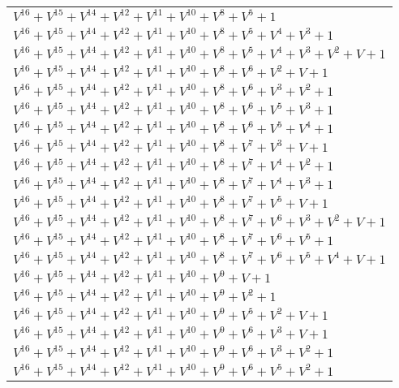\documentclass[12pt]{article}
\begin{document}
\begin{adjustwidth}{-4cm}{}
\begin{center}
\begin{longtable}{|l|}
$V^{16}  +V^{15}  +V^{14}  +V^{12}  +V^{11}  +V^{10}  +V^{8}  +V^{5}  + 1$ \\
$V^{16}  +V^{15}  +V^{14}  +V^{12}  +V^{11}  +V^{10}  +V^{8}  +V^{5}  +V^{4}  +V^{3}  + 1$ \\
$V^{16}  +V^{15}  +V^{14}  +V^{12}  +V^{11}  +V^{10}  +V^{8}  +V^{5}  +V^{4}  +V^{3}  +V^{2}  + V + 1$ \\
$V^{16}  +V^{15}  +V^{14}  +V^{12}  +V^{11}  +V^{10}  +V^{8}  +V^{6}  +V^{2}  + V + 1$ \\
$V^{16}  +V^{15}  +V^{14}  +V^{12}  +V^{11}  +V^{10}  +V^{8}  +V^{6}  +V^{3}  +V^{2}  + 1$ \\
$V^{16}  +V^{15}  +V^{14}  +V^{12}  +V^{11}  +V^{10}  +V^{8}  +V^{6}  +V^{5}  +V^{3}  + 1$ \\
$V^{16}  +V^{15}  +V^{14}  +V^{12}  +V^{11}  +V^{10}  +V^{8}  +V^{6}  +V^{5}  +V^{4}  + 1$ \\
$V^{16}  +V^{15}  +V^{14}  +V^{12}  +V^{11}  +V^{10}  +V^{8}  +V^{7}  +V^{3}  + V + 1$ \\
$V^{16}  +V^{15}  +V^{14}  +V^{12}  +V^{11}  +V^{10}  +V^{8}  +V^{7}  +V^{4}  +V^{2}  + 1$ \\
$V^{16}  +V^{15}  +V^{14}  +V^{12}  +V^{11}  +V^{10}  +V^{8}  +V^{7}  +V^{4}  +V^{3}  + 1$ \\
$V^{16}  +V^{15}  +V^{14}  +V^{12}  +V^{11}  +V^{10}  +V^{8}  +V^{7}  +V^{5}  + V + 1$ \\
$V^{16}  +V^{15}  +V^{14}  +V^{12}  +V^{11}  +V^{10}  +V^{8}  +V^{7}  +V^{6}  +V^{3}  +V^{2}  + V + 1$ \\
$V^{16}  +V^{15}  +V^{14}  +V^{12}  +V^{11}  +V^{10}  +V^{8}  +V^{7}  +V^{6}  +V^{5}  + 1$ \\
$V^{16}  +V^{15}  +V^{14}  +V^{12}  +V^{11}  +V^{10}  +V^{8}  +V^{7}  +V^{6}  +V^{5}  +V^{4}  + V + 1$ \\
$V^{16}  +V^{15}  +V^{14}  +V^{12}  +V^{11}  +V^{10}  +V^{9}  + V + 1$ \\
$V^{16}  +V^{15}  +V^{14}  +V^{12}  +V^{11}  +V^{10}  +V^{9}  +V^{2}  + 1$ \\
$V^{16}  +V^{15}  +V^{14}  +V^{12}  +V^{11}  +V^{10}  +V^{9}  +V^{5}  +V^{2}  + V + 1$ \\
$V^{16}  +V^{15}  +V^{14}  +V^{12}  +V^{11}  +V^{10}  +V^{9}  +V^{6}  +V^{3}  + V + 1$ \\
$V^{16}  +V^{15}  +V^{14}  +V^{12}  +V^{11}  +V^{10}  +V^{9}  +V^{6}  +V^{3}  +V^{2}  + 1$ \\
$V^{16}  +V^{15}  +V^{14}  +V^{12}  +V^{11}  +V^{10}  +V^{9}  +V^{6}  +V^{5}  +V^{2}  + 1$ \\

\end{longtable}
\end{center}
\end{adjustwidth}
\end{document}

